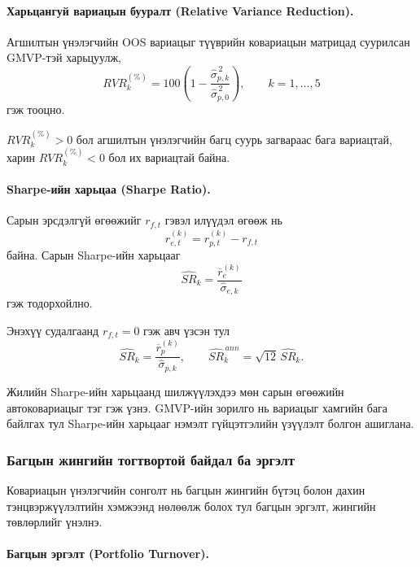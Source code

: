 \paragraph{Харьцангуй вариацын бууралт
	(Relative Variance Reduction).}

Агшилтын үнэлэгчийн OOS вариацыг
түүврийн ковариацын матрицад суурилсан
GMVP-тэй харьцуулж,
\[
RVR_k^{(\%)}
=
100\left(
1-
\frac{\widehat{\sigma}_{p,k}^{\,2}}
{\widehat{\sigma}_{p,0}^{\,2}}
\right),
\qquad k=1,\ldots,5
\]
гэж тооцно.

$RVR_k^{(\%)}>0$ бол агшилтын үнэлэгчийн
багц суурь загвараас бага вариацтай,
харин $RVR_k^{(\%)}<0$ бол их вариацтай
байна.

\paragraph{Sharpe-ийн харьцаа
	(Sharpe Ratio).}

Сарын эрсдэлгүй өгөөжийг $r_{f,t}$
гэвэл илүүдэл өгөөж нь
\[
r_{e,t}^{(k)}
=
r_{p,t}^{(k)}-r_{f,t}
\]
байна. Сарын Sharpe-ийн харьцааг
\[
\widehat{SR}_k
=
\frac{\overline{r}_e^{(k)}}
{\widehat{\sigma}_{e,k}}
\]
гэж тодорхойлно.

Энэхүү судалгаанд $r_{f,t}=0$
гэж авч үзсэн тул
\[
\widehat{SR}_k
=
\frac{\overline{r}_p^{(k)}}
{\widehat{\sigma}_{p,k}},
\qquad
\widehat{SR}_k^{\,ann}
=
\sqrt{12}\,\widehat{SR}_k.
\]

Жилийн Sharpe-ийн харьцаанд шилжүүлэхдээ
мөн сарын өгөөжийн автоковариацыг тэг
гэж үзнэ. GMVP-ийн зорилго нь вариацыг
хамгийн бага байлгах тул Sharpe-ийн
харьцааг нэмэлт гүйцэтгэлийн үзүүлэлт
болгон ашиглана.


\subsubsection{Багцын жингийн тогтвортой
	байдал ба эргэлт}
\label{subsubsec:weight_stability}

Ковариацын үнэлэгчийн сонголт нь
багцын жингийн бүтэц болон дахин
тэнцвэржүүлэлтийн хэмжээнд нөлөөлж
болох тул багцын эргэлт, жингийн
төвлөрлийг үнэлнэ.


\paragraph{Багцын эргэлт (Portfolio Turnover).}

